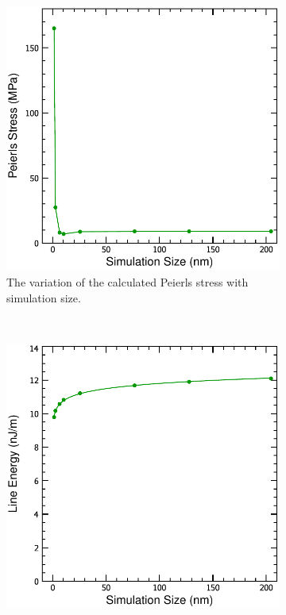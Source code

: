 \begin{figure}
\centering
\begin{subfigure}{0.4\textwidth}
\centering
\includegraphics[width=\textwidth]{Tp_vs_size}
\caption{The variation of the calculated Peierls stress with simulation size.}
\end{subfigure}
~
\begin{subfigure}{0.4\textwidth}
\centering
\includegraphics[width=\textwidth]{Energy_vs_size}

\end{subfigure}
\end{figure}

